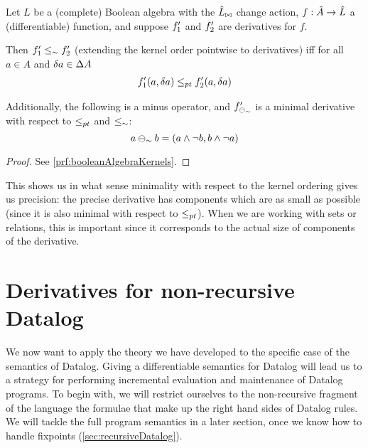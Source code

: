 \begin{prop}[name=Boolean algebra kernels, restate=booleanAlgebraKernels]
  \label{prop:booleanAlgebraKernels}
  Let $L$ be a (complete) Boolean algebra with the $\hat{L}_{\bowtie}$ change action,
  $f: \hat{A} \rightarrow \hat{L}$ a (differentiable) function, and suppose 
  $f'_1$ and $f'_2$ are derivatives for $f$.

  Then $f'_1 \leq_\sim f'_2$ (extending the kernel order pointwise to derivatives)
  iff for all $a \in A$ and $\delta a \in \Delta A$
  \begin{align*}
    f'_1(a, \delta a) \leq_{pt} f'_2(a, \delta a)
  \end{align*}

  Additionally, the following is a minus operator, and $f'_{\ominus_\sim}$ is a minimal
  derivative with respect to $\leq_{pt}$ and $\leq_\sim$:
  \begin{displaymath}
    a \ominus_\sim b = (a \wedge \neg b, b \wedge \neg a)
  \end{displaymath}
\end{prop}
\ifproofs
\begin{proof}
  See \cref{prf:booleanAlgebraKernels}.
\end{proof}
\fi

This shows us in what sense minimality with respect to the kernel ordering gives
us precision: the precise derivative has components which are as small as
possible (since it is also minimal with respect to $\leq_{pt}$).
When we are working with sets or relations, this is important since it
corresponds to the actual size of components of the derivative.

\section{Derivatives for non-recursive Datalog}
\label{sec:nonRecursiveDatalog}

We now want to apply the theory we have developed to the specific case of the semantics
of Datalog. Giving a differentiable semantics for Datalog will
lead us to a strategy for performing incremental evaluation and maintenance of Datalog programs. 
To begin with, we will restrict ourselves to the non-recursive fragment of the
language \textemdash{} the formulae that make up the right hand sides of Datalog
rules. We will tackle the full program semantics in a later section, once we
know how to handle fixpoints (\cref{sec:recursiveDatalog}).

